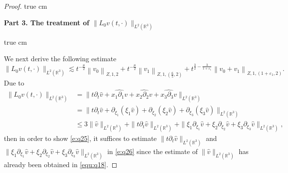 \documentclass[11pt,twoside]{article}
\newcommand{\R}{\mathbb R}
\newcommand{\p}{\partial}
\newcommand{\f}{\frac}
\theoremstyle{plain}
\theoremstyle{definition}
\theoremstyle{remark}
\numberwithin{equation}{section}
\begin{document}
\begin{proof}
 true cm

{\bf Part 3.  The treatment  of $\|L_0v(t, \cdot)\|_{L^2(\R^3)}$ }

 true cm

We next derive the following estimate
\begin{equation}\label{e:q25}
\|L_0v(t, \cdot)\|_{L^2(\R^3)} \lesssim t^{-\f{\mu}{2}}\left\|v_0\right\|_{Z, 1, 2}+t^{-\f{\mu}{2}}\left\|v_1\right\|_{Z, 1,(\f65, 2)}+t^{\f32-\f{3}{1+\varepsilon_1}}\left\|v_0+v_1\right\|_{Z, 1,(1+\varepsilon_1, 2)}.
\end{equation}
Due to
\begin{equation}\label{e:q26}
\begin{aligned}
\|L_0v(t, \cdot)\|_{L^2(\R^3)}& =\|t\p_t\hat{v}+\widehat{x_1\p_1v}+\widehat{x_2\p_2v}+\widehat{x_3\p_3v}\|_{L^2(\R^3)}\\
& =\|t\p_t\hat{v}+\p_{\xi_1}(\xi_1\hat{v})+\p_{\xi_2}(\xi_2\hat{v})+\p_{\xi_3}(\xi_3\hat{v})\|_{L^2(\R^3)}\\
&\leq 3\|\hat{v}\|_{L^2(\R^3)}+\|t\p_t\hat{v}\|_{L^2(\R^3)}+\|\xi_1\p_{\xi_1}\hat{v}+\xi_2\p_{\xi_2}\hat{v}+\xi_3\p_{\xi_3}\hat{v}\|_{L^2(\R^3)},
\end{aligned}
\end{equation}
then in order to show \eqref{e:q25}, it suffices to estimate $\|t\p_t\hat{v}\|_{L^2(\R^3)}$ and $\|\xi_1\p_{\xi_1}\hat{v}+\xi_2\p_{\xi_2}\hat{v}+\xi_3\p_{\xi_3}\hat{v}\|_{L^2(\R^3)}$ in \eqref{e:q26} since the estimate of $\|\hat{v}\|_{L^2(\R^3)}$ has already been obtained in \eqref{equ:q18}.


\end{proof}
\end{document}

